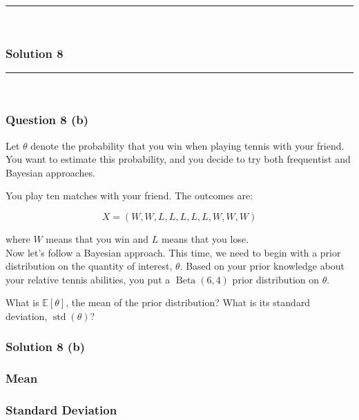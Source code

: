 \documentclass{article}
\begin{document}
\noindent\rule{\textwidth}{0.4pt}\\

\newpage

\subsubsection*{Solution 8}
\noindent\rule{\textwidth}{0.4pt}\\
\subsubsection*{Question 8 (b)}
\begin{flushleft}
Let $\theta$ denote the probability that you win when playing tennis with your friend. You want to estimate this probability, and you decide to try both frequentist and Bayesian approaches.

You play ten matches with your friend. The outcomes are:
\end{flushleft}
$$X = (W, W, L, L, L, L, L, W, W, W)$$

\begin{flushleft}
where $W$ means that you win and $L$ means that you lose.\\

Now let's follow a Bayesian approach. This time, we need to begin with a prior distribution on the quantity of interest, $\theta$. Based on your prior knowledge about your relative tennis abilities, you put a $\operatorname{Beta}(6,4)$ prior distribution on $\theta$.

What is $\mathbb{E}[\theta]$, the mean of the prior distribution? What is its standard deviation, $\operatorname{std}(\theta)$?

\end{flushleft}

\subsubsection*{Solution 8 (b)}

\subsubsection*{Mean}


\subsubsection*{Standard Deviation}
\end{document}
